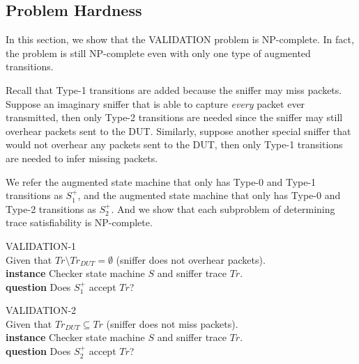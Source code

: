 \subsection{Problem Hardness}
\label{subsec:hard}

In this section, we show that the VALIDATION problem is NP-complete. In
fact, the problem is still NP-complete even with only one type of augmented
transitions.

Recall that Type-1 transitions are added because the sniffer may miss packets.
Suppose an imaginary sniffer that is able to capture \textit{every} packet ever
transmitted, then only Type-2 transitions are needed since the sniffer may still
overhear packets sent to the DUT. Similarly, suppose another special sniffer
that would not overhear any packets sent to the DUT, then only Type-1
transitions are needed to infer missing packets.

We refer the augmented state machine that only has Type-0 and Type-1
transitions as $S^+_1$, and the augmented state machine that only has Type-0 and
Type-2 transitions as $S^+_2$. And we show that each subproblem of determining
trace satisfiability is NP-complete.

\begin{problem}
  VALIDATION-1\\
  Given that $Tr\setminus Tr_{DUT}=\emptyset$ (sniffer does not overhear
  packets).\\
  \textbf{instance} Checker state machine $S$ and sniffer trace $Tr$.\\
  \textbf{question} Does $S^+_1$ accept $Tr$?
\end{problem}

\begin{problem}
  VALIDATION-2\\
  Given that $Tr_{DUT} \subseteq Tr$ (sniffer does not miss packets).\\
  \textbf{instance} Checker state machine $S$ and sniffer trace $Tr$.\\
  \textbf{question} Does $S^+_2$ accept $Tr$?
\end{problem}

